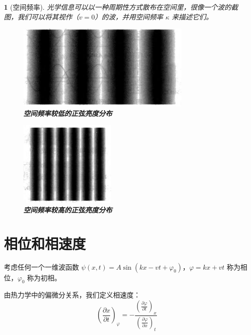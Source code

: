\documentclass[UTF8]{report}
\theoremstyle{MyLineTheoremStyle} %
\theoremstyle{MyBlockTheoremStyle} %
\theoremstyle{MySubsubsectionStyle} %
\newtheorem{definition}{}
\begin{document}
\begin{definition}[空间频率]
光学信息可以以一种周期性方式散布在空间里，很像一个波的截图，我们可以将其视作（$v=0$）的波，并用空间频率 $\kappa$ 来描述它们。


\noindent\begin{minipage}{0.63\textwidth}
    \begin{figure}[H]\centering
    \includegraphics[height=120pt]{assets/image (41).jpg}
    \caption{\textbf{空间频率较低的正弦亮度分布}}\label{空间频率较低的正弦亮度分布}
    \end{figure}
    \end{minipage}
    \begin{minipage}{0.35\textwidth}
    \begin{figure}[H]\centering
    \includegraphics[height=120pt]{assets/image (42).jpg}
    \caption{\textbf{空间频率较高的正弦亮度分布}}\label{空间频率较高的正弦亮度分布}
    \end{figure}
\end{minipage}
\end{definition}

\section{相位和相速度}
考虑任何一个一维波函数 $\psi(x,t) = A \sin(kx-vt + \varphi_0)$，$\varphi = kx+vt$ 称为相位，$\varphi_0$ 称为初相。

由热力学中的偏微分关系，我们定义相速度：
\begin{equation}
    \left(\frac{\partial x }{\partial t }\right)_{\varphi} = -\frac{\left(\frac{\partial \varphi }{\partial t }\right)_{x}}{\left(\frac{\partial \varphi }{\partial x }\right)_{t}}
\end{equation}


\end{document}
